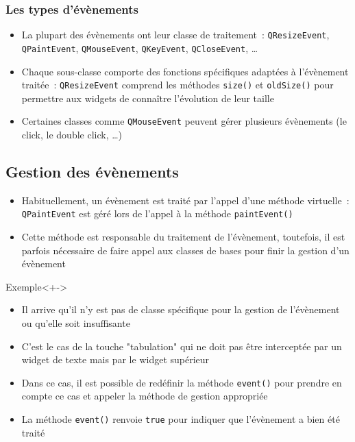 \documentclass{beamer} %
\begin{document}
\begin{frame}
	\frametitle{Les types d'évènements}
	
	\begin{itemize}
	 \item<+-> La plupart des évènements ont leur classe de traitement~: \texttt{QResizeEvent}, \texttt{QPaintEvent}, \texttt{QMouseEvent}, \texttt{QKeyEvent}, \texttt{QCloseEvent}, \ldots
	 \item<+-> Chaque sous-classe comporte des fonctions spécifiques adaptées à l'évènement traitée~: \texttt{QResizeEvent} comprend les méthodes \texttt{size()} et \texttt{oldSize()} pour permettre aux widgets de connaître l'évolution de leur taille
	 \item<+-> Certaines classes comme \texttt{QMouseEvent} peuvent gérer plusieurs évènements (le click, le double click, \ldots)
	\end{itemize}
\end{frame}

\subsection{Gestion des évènements}
\begin{frame}
	\begin{itemize}
	 \item<+-> Habituellement, un évènement est traité par l'appel d'une méthode virtuelle~: \texttt{QPaintEvent} est géré lors de l'appel à la méthode \texttt{paintEvent()}
	 \item<+-> Cette méthode est responsable du traitement de l'évènement, toutefois, il est parfois nécessaire de faire appel aux classes de bases pour finir la gestion d'un évènement
	\end{itemize}
	
\begin{exampleblock}{Exemple}<+->
	
\end{exampleblock}
\end{frame}

\begin{frame}
	\begin{itemize}
	 \item<+-> Il arrive qu'il n'y est pas de classe spécifique pour la gestion de l'évènement ou qu'elle soit insuffisante
	 \item<+-> C'est le cas de la touche "tabulation" qui ne doit pas être interceptée par un widget de texte mais par le widget supérieur
	 \item<+-> Dans ce cas, il est possible de redéfinir la méthode \texttt{event()} pour prendre en compte ce cas et appeler la méthode de gestion appropriée
	 \item<+-> La méthode \texttt{event()} renvoie \texttt{true} pour indiquer que l'évènement a bien été traité
	\end{itemize}
\end{frame}
\end{document}
